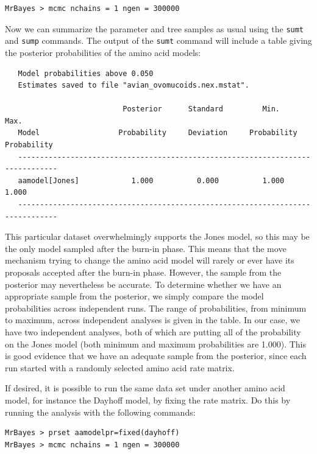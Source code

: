 \documentclass[12pt]{book}
\newcommand{\ttt}[1]{\texttt{#1} }
\begin{document}
\begin{verbatim}
MrBayes > mcmc nchains = 1 ngen = 300000
\end{verbatim}

Now we can summarize the parameter and tree samples as usual using the \ttt{sumt} and \ttt{sump}
commands. The output of the \ttt{sumt} command will include a table giving the posterior probabilities
of the amino acid models:


\begin{singlespacing}
\scriptsize
\begin{verbatim}
   Model probabilities above 0.050
   Estimates saved to file "avian_ovomucoids.nex.mstat".

                           Posterior      Standard         Min.           Max.   
   Model                  Probability     Deviation     Probability    Probability
   -------------------------------------------------------------------------------
   aamodel[Jones]            1.000          0.000          1.000          1.000
   -------------------------------------------------------------------------------
\end{verbatim}
\normalsize
\end{singlespacing}

This particular dataset overwhelmingly supports the Jones model, so this may be the only model sampled
after the burn-in phase. This means that the move mechanism trying to change the
amino acid model will rarely or ever have its proposals accepted after the burn-in phase. However, the
sample from the posterior may nevertheless be accurate. To determine whether we have an appropriate sample
from the posterior, we simply compare the model probabilities across independent runs. The range of probabilities,
from minimum to maximum, across independent
analyses is given in the table. In our case, we have two independent analyses, both of which are putting all of the
probability on the Jones model (both minimum and maximum probabilities are 1.000). This is good evidence that
we have an adequate sample from the posterior, since each run started with a randomly selected amino acid
rate matrix.

If desired, it is possible to run the same data set under another amino acid model, for instance the Dayhoff
model, by fixing the rate matrix. Do this by running the analysis with the following commands:

\begin{singlespacing}
\begin{verbatim}
MrBayes > prset aamodelpr=fixed(dayhoff)
MrBayes > mcmc nchains = 1 ngen = 300000
\end{verbatim}
\end{singlespacing}
\end{document}
